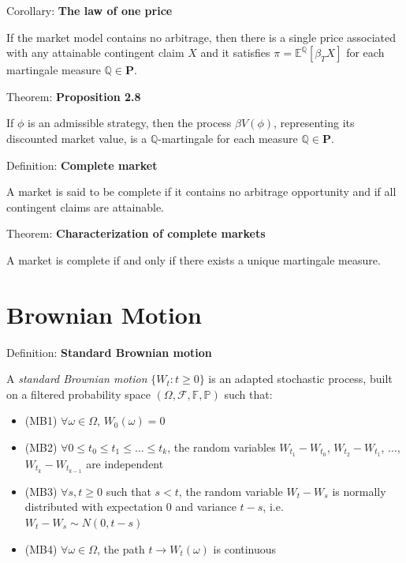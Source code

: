 \documentclass[12pt,a4paper]{article}
\begin{document}
Corollary: \textbf{The law of one price}
\vspace{0.5em}

If the market model contains no arbitrage, then there is a single price associated with any attainable contingent claim $X$ and it satisfies $\pi = \mathbb{E}^{\mathbb{Q}}[\beta_T X]$ for each martingale measure $\mathbb{Q} \in \mathbf{P}$.
\vspace{1em}

Theorem: \textbf{Proposition 2.8}
\vspace{0.5em}

If $\phi$ is an admissible strategy, then the process $\beta V(\phi)$, representing its discounted market value, is a $\mathbb{Q}$-martingale for each measure $\mathbb{Q} \in \mathbf{P}$.
\vspace{1em}

Definition: \textbf{Complete market}
\vspace{0.5em}

A market is said to be complete if it contains no arbitrage opportunity and if all contingent claims are attainable.
\vspace{1em}

Theorem: \textbf{Characterization of complete markets}
\vspace{0.5em}

A market is complete if and only if there exists a unique martingale measure.
\vspace{1em}

\section{Brownian Motion}


Definition: \textbf{Standard Brownian motion}
\vspace{0.5em}

A \textit{standard Brownian motion} $\{W_t : t \geq 0\}$ is an adapted stochastic process, built on a filtered probability space $(\Omega, \mathcal{F}, \mathbb{F}, \mathbb{P})$ such that:

\begin{itemize}
	\item (MB1) $\forall \omega \in \Omega$, $W_0(\omega) = 0$
	\item (MB2) $\forall 0 \leq t_0 \leq t_1 \leq \ldots \leq t_k$, the random variables $W_{t_1} - W_{t_0}$, $W_{t_2} - W_{t_1}$, $\ldots$, $W_{t_k} - W_{t_{k-1}}$ are independent
	\item (MB3) $\forall s, t \geq 0$ such that $s < t$, the random variable $W_t - W_s$ is normally distributed with expectation 0 and variance $t - s$, i.e. $W_t - W_s \sim N(0, t - s)$
	\item (MB4) $\forall \omega \in \Omega$, the path $t \to W_t(\omega)$ is continuous
\end{itemize}
\vspace{1em}
\end{document}
